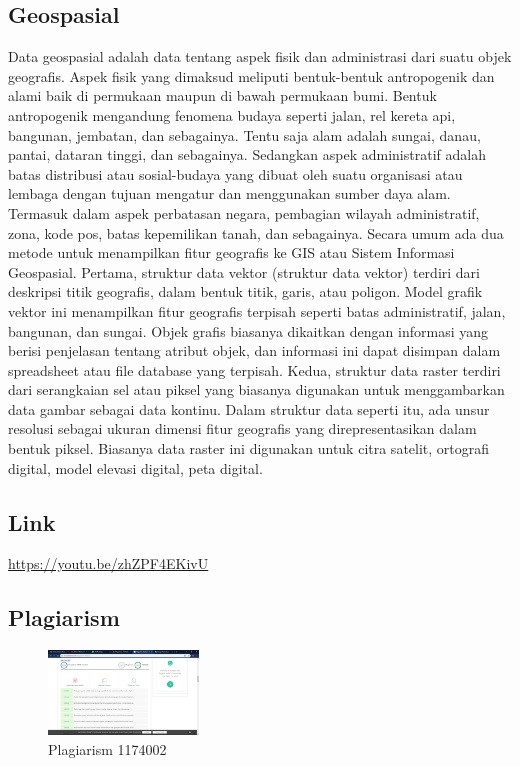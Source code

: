 \subsection{Geospasial}
Data geospasial adalah data tentang aspek fisik dan administrasi dari suatu objek geografis. Aspek fisik yang dimaksud meliputi bentuk-bentuk antropogenik dan alami baik di permukaan maupun di bawah permukaan bumi. Bentuk antropogenik mengandung fenomena budaya seperti jalan, rel kereta api, bangunan, jembatan, dan sebagainya. Tentu saja alam adalah sungai, danau, pantai, dataran tinggi, dan sebagainya. Sedangkan aspek administratif adalah batas distribusi atau sosial-budaya yang dibuat oleh suatu organisasi atau lembaga dengan tujuan mengatur dan menggunakan sumber daya alam. Termasuk dalam aspek perbatasan negara, pembagian wilayah administratif, zona, kode pos, batas kepemilikan tanah, dan sebagainya.
Secara umum ada dua metode untuk menampilkan fitur geografis ke GIS atau Sistem Informasi Geospasial. Pertama, struktur data vektor (struktur data vektor) terdiri dari deskripsi titik geografis, dalam bentuk titik, garis, atau poligon. Model grafik vektor ini menampilkan fitur geografis terpisah seperti batas administratif, jalan, bangunan, dan sungai. Objek grafis biasanya dikaitkan dengan informasi yang berisi penjelasan tentang atribut objek, dan informasi ini dapat disimpan dalam spreadsheet atau file database yang terpisah. Kedua, struktur data raster terdiri dari serangkaian sel atau piksel yang biasanya digunakan untuk menggambarkan data gambar sebagai data kontinu. Dalam struktur data seperti itu, ada unsur resolusi sebagai ukuran dimensi fitur geografis yang direpresentasikan dalam bentuk piksel. Biasanya data raster ini digunakan untuk citra satelit, ortografi digital, model elevasi digital, peta digital.

\subsection{Link}
\href{https://youtu.be/zhZPF4EKivU}{https://youtu.be/zhZPF4EKivU}

\subsection{Plagiarism}
\begin{figure}[H]
	\includegraphics[width=4cm]{figures/1174002/SSGIS.png}
	\centering
	\caption{Plagiarism 1174002}
\end{figure}
